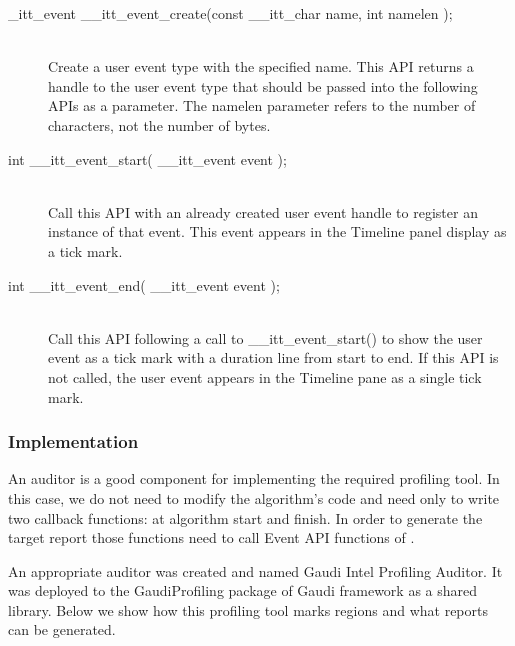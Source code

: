 \begin{description}
\item[\_itt\_event \_\_itt\_event\_create(const \_\_itt\_char \*name, int namelen );] \hfill \\
Create a user event type with the specified name. This API returns a handle to the user event type that should be 
passed into the following APIs as a parameter. The namelen parameter refers to the number of characters, 
not the number of bytes.

\item[int \_\_itt\_event\_start( \_\_itt\_event event );] \hfill \\
Call this API with an already created user event handle to register an instance of that event. This event appears 
in the Timeline panel display as a tick mark.

\item[int \_\_itt\_event\_end( \_\_itt\_event event );] \hfill \\
Call this API following a call to \_\_itt\_event\_start() to show the user event as a tick mark with a duration line 
from start to end. If this API is not called, the user event appears in the Timeline pane as a single tick mark.
\end{description}

\subsubsection{Implementation}

An auditor is a good component for implementing the required profiling tool. In
this case, we do not need to modify the algorithm’s code and need only to write
two callback functions: at algorithm start and finish. In order to generate the
target report those functions need to call Event API functions of \amp.

An appropriate auditor was created and named Gaudi Intel Profiling Auditor. It
was deployed to the GaudiProfiling package of Gaudi framework as a shared
library. Below we show how this profiling tool marks regions and what reports
can be generated.

